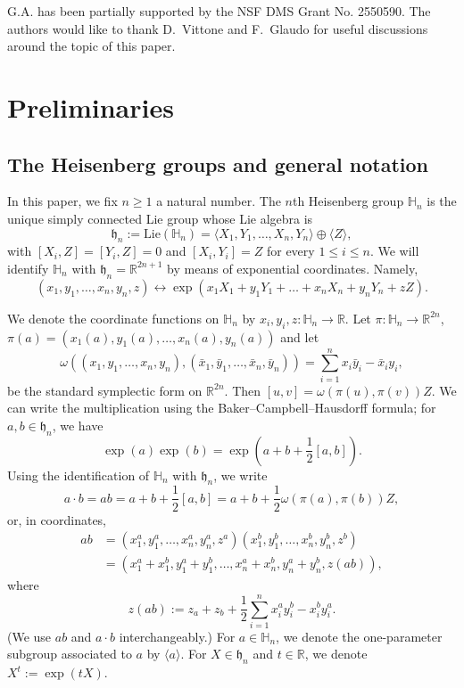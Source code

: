 \documentclass[12pt,reqno]{amsart}
\newcommand{\HH}{\mathbb{H}}
\newcommand{\R}{\mathbb{R}}
\newcommand{\from}{\colon}
\theoremstyle{remark}
\newcommand{\0}{\mathbf{0}}
\renewcommand{\1}{\mathbf 1}
\begin{document}
G.A. has been partially supported by the NSF DMS Grant No. 2550590. The authors would like to thank D.\ Vittone and F.\ Glaudo for useful discussions around the topic of this paper.

\vspace{0.5cm}




\section{Preliminaries}\label{sec:prel}
\medskip

\subsection{The Heisenberg groups and general notation}\label{sec:H1}

In this paper, we fix $n\geq 1$ a natural number. The $n$th Heisenberg group $\HH_n$ is the unique simply connected Lie group whose Lie algebra is $$\mathfrak{h}_n:=\mathrm{Lie}(\HH_n)=\langle X_1,Y_1,\ldots,X_n,Y_n\rangle \oplus \langle Z\rangle,$$ with $[X_i,Z]=[Y_i,Z]=0$ and $[X_i,Y_i]=Z$ for every $1\leq i\leq n$. We will identify $\HH_n$ with $\mathfrak{h}_n=\mathbb R^{2n+1}$ by means of exponential coordinates. Namely, 
\[
(x_1,y_1,\ldots,x_n,y_n,z) \leftrightarrow \exp(x_1X_1+y_1Y_1+\ldots+x_nX_n+y_nY_n+zZ).
\]

We denote the coordinate functions on $\HH_n$ by $x_i,y_i,z\from \HH_n\to \R$. Let $\pi\from \HH_n \to \R^{2n}$, $\pi(a) = (x_1(a),y_1(a),\ldots,x_n(a),y_n(a))$ and let $$\omega((x_1,y_1,\ldots,x_n,y_n),(\bar x_1,\bar y_1,\ldots,\bar x_n,\bar y_n)) = \sum_{i=1}^n x_i\bar y_i-\bar x_iy_i,$$ be the standard symplectic form on $\R^{2n}$. Then $[u,v] = \omega(\pi(u),\pi(v))Z$.
We can write the multiplication using the Baker--Campbell--Hausdorff formula; for $a,b\in \mathfrak{h}_n$, we have
$$
\exp(a)\exp(b) = \exp\left(a+b+\frac{1}{2}[a,b]\right).
$$
Using the identification of $\HH_n$ with $\mathfrak{h}_n$, we write
\begin{equation}
  \label{eq:group-law}
  a\cdot b = ab=a+b+\frac{1}{2}[a,b] = a + b + \frac{1}{2}\omega(\pi(a),\pi(b)) Z,
\end{equation}
or, in coordinates,
\[
\begin{aligned}
  a b &= (x_1^a,y_1^a,\ldots,x_n^a,y_n^a,z^a)(x_1^b,y_1^b,\ldots,x_n^b,y_n^b,z^b)  \\
  &= (x_1^a+x_1^b,y_1^a+y_1^b,\ldots,x_n^a+x_n^b,y_n^a+y_n^b,z(ab)),
\end{aligned}
\]
where 
\[z(a b):=z_a+z_b+\frac{1}{2}\sum_{i=1}^n x_i^ay_i^b-x_i^by_i^a.\]
(We use $ab$ and $a\cdot b$ interchangeably.)
  For $a\in \HH_n$, we denote the one-parameter subgroup associated to $a$ by $\langle a \rangle$. For $X\in\mathfrak{h}_n$ and $t\in\mathbb R$, we denote $X^t:=\exp(tX)$.
\end{document}
